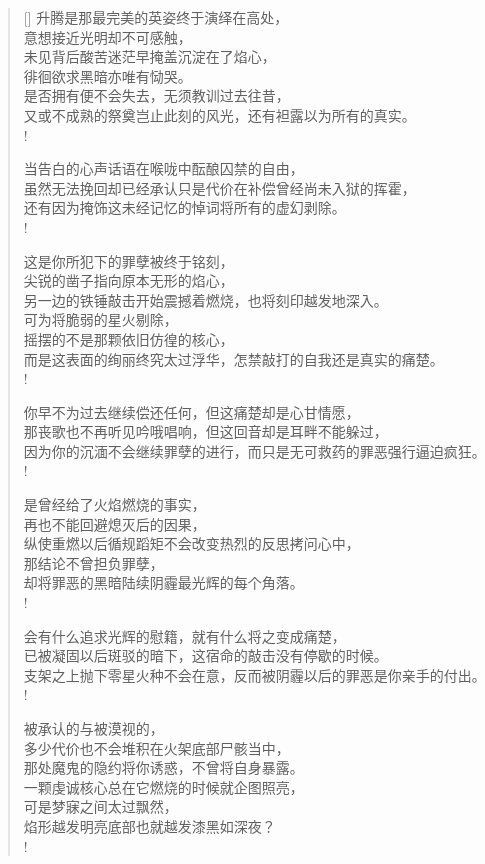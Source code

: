 \documentclass[UTF8, 12pt, a4paper]{ctexrep} %
\begin{document}
\begin{verse}[\versewidth]
升腾是那最完美的英姿终于演绎在高处，\\
意想接近光明却不可感触，\\
未见背后酸苦迷茫早掩盖沉淀在了焰心，\\
徘徊欲求黑暗亦唯有恸哭。\\
是否拥有便不会失去，无须教训过去往昔，\\
又或不成熟的祭奠岂止此刻的风光，还有袒露以为所有的真实。\\!

当告白的心声话语在喉咙中酝酿囚禁的自由，\\
虽然无法挽回却已经承认只是代价在补偿曾经尚未入狱的挥霍，\\
还有因为掩饰这未经记忆的悼词将所有的虚幻剥除。\\!

这是你所犯下的罪孽被终于铭刻，\\
尖锐的凿子指向原本无形的焰心，\\
另一边的铁锤敲击开始震撼着燃烧，也将刻印越发地深入。\\
可为将脆弱的星火剔除，\\
摇摆的不是那颗依旧仿徨的核心，\\
而是这表面的绚丽终究太过浮华，怎禁敲打的自我还是真实的痛楚。\\!

你早不为过去继续偿还任何，但这痛楚却是心甘情愿，\\
那丧歌也不再听见吟哦唱响，但这回音却是耳畔不能躲过，\\
因为你的沉湎不会继续罪孽的进行，而只是无可救药的罪恶强行逼迫疯狂。\\!

是曾经给了火焰燃烧的事实，\\
再也不能回避熄灭后的因果，\\
纵使重燃以后循规蹈矩不会改变热烈的反思拷问心中，\\
那结论不曾担负罪孽，\\
却将罪恶的黑暗陆续阴霾最光辉的每个角落。\\!

会有什么追求光辉的慰籍，就有什么将之变成痛楚，\\
已被凝固以后斑驳的暗下，这宿命的敲击没有停歇的时候。\\
支架之上抛下零星火种不会在意，反而被阴霾以后的罪恶是你亲手的付出。\\!

被承认的与被漠视的，\\
多少代价也不会堆积在火架底部尸骸当中，\\
那处魔鬼的隐约将你诱惑，不曾将自身暴露。\\
一颗虔诚核心总在它燃烧的时候就企图照亮，\\
可是梦寐之间太过飘然，\\
焰形越发明亮底部也就越发漆黑如深夜？\\!


\end{verse}
\end{document}
